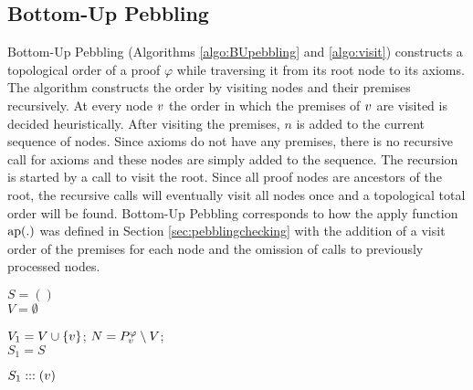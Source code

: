 \subsection{Bottom-Up Pebbling}

Bottom-Up Pebbling (Algorithms \ref{algo:BUpebbling} and \ref{algo:visit}) constructs a topological order of a proof $\varphi$ while traversing it from its root node to its axioms. The algorithm constructs the order by visiting nodes and their premises recursively. At every node $v$ the order in which the premises of $v$ are visited is decided heuristically. After visiting the premises, $n$ is added to the current sequence of nodes.
Since axioms do not have any premises, there is no recursive call for axioms and these nodes are simply added to the sequence. The recursion is started by a call to visit the root.
Since all proof nodes are ancestors of the root, the recursive calls will eventually visit all nodes once and a topological total order will be found.
Bottom-Up Pebbling corresponds to how the apply function $\operatorname{ap}(.)$ was defined in Section \ref{sec:pebblingchecking} with the addition of a visit order of the premises for each node and the omission of calls to previously processed nodes.


\begin{algorithm}[h]
  \BlankLine

	$S = ()$\; \\
	$V = \emptyset$\;
	\Return {}\;

  \caption[.]{}
  \label{algo:BUpebbling}
\end{algorithm}

\begin{algorithm}[h]
	
	$V_1 = V \cup \{v\}$;
	$N = P_{v}^{\varphi} \setminus V$;  \\
	$S_1 = S$\;
	
	
	\Return $S_1 ::: (v)$\;
	
  \caption[.]{}
  \label{algo:visit}
\end{algorithm}

